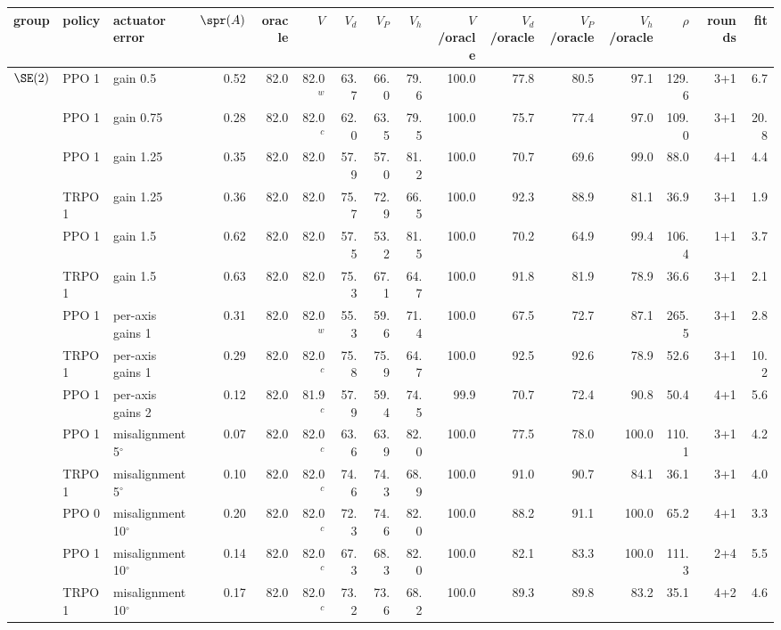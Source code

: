 \begin{tabular}{@{}lllrrrrrrrrrrrrr@{}}
\toprule
group & policy & actuator error & $\spr(A)$ & oracle & $V$ & $V_d$ & $V_P$ & $V_h$ & $V$/oracle & $V_d$/oracle & $V_P$/oracle & $V_h$/oracle & $\rho$ & rounds & fit \\
\midrule
$\SE(2)$ & PPO 1 & gain 0.5 & 0.52 & 82.0 & 82.0$^{w}$ & 63.7 & 66.0 & 79.6 & 100.0 & 77.8 & 80.5 & 97.1 & 129.6 & 3+1 & 6.7 \\
 & PPO 1 & gain 0.75 & 0.28 & 82.0 & 82.0$^{c}$ & 62.0 & 63.5 & 79.5 & 100.0 & 75.7 & 77.4 & 97.0 & 109.0 & 3+1 & 20.8 \\
 & PPO 1 & gain 1.25 & 0.35 & 82.0 & 82.0 & 57.9 & 57.0 & 81.2 & 100.0 & 70.7 & 69.6 & 99.0 & 88.0 & 4+1 & 4.4 \\
 & TRPO 1 & gain 1.25 & 0.36 & 82.0 & 82.0 & 75.7 & 72.9 & 66.5 & 100.0 & 92.3 & 88.9 & 81.1 & 36.9 & 3+1 & 1.9 \\
 & PPO 1 & gain 1.5 & 0.62 & 82.0 & 82.0 & 57.5 & 53.2 & 81.5 & 100.0 & 70.2 & 64.9 & 99.4 & 106.4 & 1+1 & 3.7 \\
 & TRPO 1 & gain 1.5 & 0.63 & 82.0 & 82.0 & 75.3 & 67.1 & 64.7 & 100.0 & 91.8 & 81.9 & 78.9 & 36.6 & 3+1 & 2.1 \\
 & PPO 1 & per-axis gains 1 & 0.31 & 82.0 & 82.0$^{w}$ & 55.3 & 59.6 & 71.4 & 100.0 & 67.5 & 72.7 & 87.1 & 265.5 & 3+1 & 2.8 \\
 & TRPO 1 & per-axis gains 1 & 0.29 & 82.0 & 82.0$^{c}$ & 75.8 & 75.9 & 64.7 & 100.0 & 92.5 & 92.6 & 78.9 & 52.6 & 3+1 & 10.2 \\
 & PPO 1 & per-axis gains 2 & 0.12 & 82.0 & 81.9$^{c}$ & 57.9 & 59.4 & 74.5 & 99.9 & 70.7 & 72.4 & 90.8 & 50.4 & 4+1 & 5.6 \\
 & PPO 1 & misalignment 5$^\circ$ & 0.07 & 82.0 & 82.0$^{c}$ & 63.6 & 63.9 & 82.0 & 100.0 & 77.5 & 78.0 & 100.0 & 110.1 & 3+1 & 4.2 \\
 & TRPO 1 & misalignment 5$^\circ$ & 0.10 & 82.0 & 82.0$^{c}$ & 74.6 & 74.3 & 68.9 & 100.0 & 91.0 & 90.7 & 84.1 & 36.1 & 3+1 & 4.0 \\
 & PPO 0 & misalignment 10$^\circ$ & 0.20 & 82.0 & 82.0$^{c}$ & 72.3 & 74.6 & 82.0 & 100.0 & 88.2 & 91.1 & 100.0 & 65.2 & 4+1 & 3.3 \\
 & PPO 1 & misalignment 10$^\circ$ & 0.14 & 82.0 & 82.0$^{c}$ & 67.3 & 68.3 & 82.0 & 100.0 & 82.1 & 83.3 & 100.0 & 111.3 & 2+4 & 5.5 \\
 & TRPO 1 & misalignment 10$^\circ$ & 0.17 & 82.0 & 82.0$^{c}$ & 73.2 & 73.6 & 68.2 & 100.0 & 89.3 & 89.8 & 83.2 & 35.1 & 4+2 & 4.6 \\

\end{tabular}
